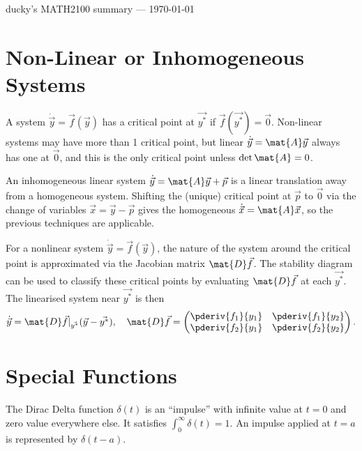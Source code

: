 \documentclass[10pt, a4paper]{article}
\begin{document}
\begin{landscape}
\begin{multicols}{2}
    \begin{tcolorbox}[colframe=red!75!black, arc=0pt, outer arc=0pt, center, hbox]
        ducky's MATH2100 summary --- \today
    \end{tcolorbox}

\end{multicols}

\pagebreak

\begin{multicols*}{2}
    \section{Non-Linear or Inhomogeneous Systems}

    A system \(\dot{\vec{y}} = \vec{f}(\vec{y})\) has a critical point at \(\vec{y^*}\) if
    \(\vec{f}(\vec{y^*}) = \vec{0}\). Non-linear systems may have more than 1 critical point,
    but linear \(\dot{\vec{y}} = \mat{A}\vec{y}\) always has one at \(\vec{0}\), and this
    is the only critical point unless \(\det \mat{A} = 0\).

    An inhomogeneous linear system \(\dot{\vec{y}} = \mat{A}\vec{y} + \vec{p}\) is a linear
    translation away from a homogeneous system. Shifting the (unique) critical point at \(\vec{p}\) to
    \(\vec{0}\) via the change of variables \(\vec{x} = \vec{y} - \vec{p}\) gives the homogeneous
    \(\dot{\vec{x}} = \mat{A} \vec{x}\), so the previous techniques are applicable.
    
    For a nonlinear system \(\dot{\vec{y}} = \vec{f}(\vec{y})\), the nature of the system around the
    critical point is approximated via the Jacobian matrix \(\mat{D}\vec{f}\). 
    The stability diagram can be used to classify these critical points by evaluating \(\mat{D}\vec{f}\)
    at each \(\vec{y^*}\). The linearised system near \(\vec{y^*}\) is then
    \[
        \dot{\vec{y}} = \mat{D}\vec{f} |_{\vec{y^{*}}} (\vec{y} - \vec{y^*}),
        \quad
        \mat{D}\vec{f} = \begin{pmatrix}
            \pderiv{f_1}{y_1} & \pderiv{f_1}{y_2} \\
            \pderiv{f_2}{y_1} & \pderiv{f_2}{y_2}
        \end{pmatrix}.
    \]
    \section{Special Functions}

    The Dirac Delta function \(\delta(t)\) is an ``impulse'' with infinite value at \(t = 0\) and
    zero value everywhere else. It satisfies \(\int_0^{\infty} \delta(t) = 1\). An impulse applied
    at \(t = a\) is represented by \(\delta(t - a)\).


\end{multicols*}
\end{landscape}
\end{document}
